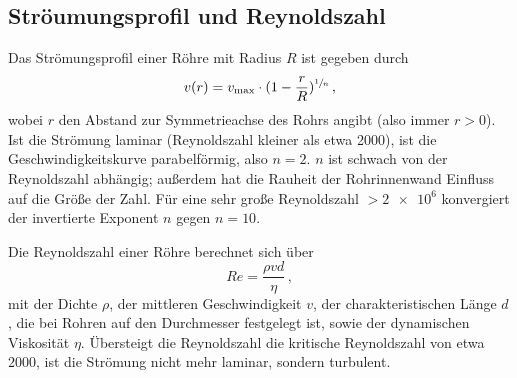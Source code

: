 \subsection{Ströumungsprofil und Reynoldszahl}
Das Strömungsprofil einer Röhre mit Radius $R$ ist gegeben \cite{Fluidik} durch
\begin{equation}
    v(r)=v_\text{max}\cdot (1-\frac{r}{R})^{\sfrac{1}{n}}\,,
    \label{eqn:Geschwindigkeit}
\end{equation}
wobei $r$ den Abstand zur Symmetrieachse des Rohrs angibt (also immer $r>0$).
Ist die Strömung laminar (Reynoldszahl kleiner als etwa 2000), ist die Geschwindigkeitskurve parabelförmig, also $n=2$.
$n$ ist schwach von der Reynoldszahl abhängig; außerdem hat die Rauheit der Rohrinnenwand Einfluss auf die Größe der Zahl. 
Für eine sehr große Reynoldszahl $>\num{2e6}$ konvergiert der invertierte Exponent $n$ gegen $n=10$. 

Die Reynoldszahl einer Röhre berechnet sich über 
\begin{equation}
    Re=\frac{\rho v d}{\eta}\,,
\end{equation}
mit der Dichte $\rho$, der mittleren Geschwindigkeit $v$, der charakteristischen Länge $d$, die bei Rohren auf den Durchmesser festgelegt ist, 
sowie der dynamischen Viskosität $\eta$. 
Übersteigt die Reynoldszahl die kritische Reynoldszahl von etwa $2000$, ist die Strömung nicht mehr laminar, sondern turbulent. 
